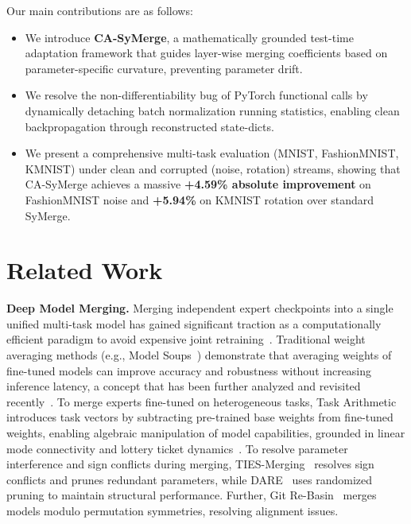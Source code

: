 \documentclass{article}
\begin{document}
Our main contributions are as follows:
\begin{itemize}\itemsep=0pt\parsep=0pt\topsep=2pt
    \item We introduce \textbf{CA-SyMerge}, a mathematically grounded test-time adaptation framework that guides layer-wise merging coefficients based on parameter-specific curvature, preventing parameter drift.
    \item We resolve the non-differentiability bug of PyTorch functional calls by dynamically detaching batch normalization running statistics, enabling clean backpropagation through reconstructed state-dicts.
    \item We present a comprehensive multi-task evaluation (MNIST, FashionMNIST, KMNIST) under clean and corrupted (noise, rotation) streams, showing that CA-SyMerge achieves a massive \textbf{+4.59\% absolute improvement} on FashionMNIST noise and \textbf{+5.94\%} on KMNIST rotation over standard SyMerge.
\end{itemize}

\section{Related Work}
\label{sec:related}

\textbf{Deep Model Merging.} Merging independent expert checkpoints into a single unified multi-task model has gained significant traction as a computationally efficient paradigm to avoid expensive joint retraining~\cite{song2026, wortsman22, ilharco22, mcmahan2017}. Traditional weight averaging methods (e.g., Model Soups~\cite{wortsman22}) demonstrate that averaging weights of fine-tuned models can improve accuracy and robustness without increasing inference latency, a concept that has been further analyzed and revisited recently~\cite{choi2024, wang2024, goddard2024}. To merge experts fine-tuned on heterogeneous tasks, Task Arithmetic~\cite{ilharco22} introduces task vectors by subtracting pre-trained base weights from fine-tuned weights, enabling algebraic manipulation of model capabilities, grounded in linear mode connectivity and lottery ticket dynamics~\cite{frankle2020, entezari2022}. To resolve parameter interference and sign conflicts during merging, TIES-Merging~\cite{yadav23} resolves sign conflicts and prunes redundant parameters, while DARE~\cite{yu23} uses randomized pruning to maintain structural performance. Further, Git Re-Basin~\cite{ainsworth2023} merges models modulo permutation symmetries, resolving alignment issues.
\end{document}
